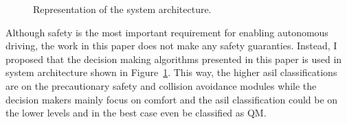 \begin{figure}[h]
%
	\caption{Representation of the system architecture.}
	\label{fig:system_architecture}
\end{figure}

Although safety is the most important requirement for enabling autonomous driving, the work in this paper does not make any safety guaranties. 
Instead, I proposed that the decision making algorithms presented in this paper is used in system architecture shown in Figure~\ref{fig:system_architecture}. This way, the higher \gls{asil} classifications are on the precautionary safety and collision avoidance modules while the decision makers mainly focus on comfort and the \gls{asil} classification could be on the lower levels and in the best case even be classified as QM. 


 
